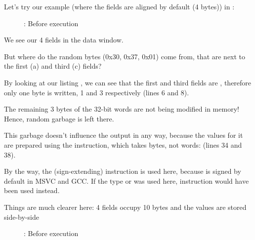 ﻿\clearpage
{}
\myindex{\olly}

Let's try our example (where the fields are aligned by default (4 bytes)) in \olly:

\begin{figure}[H]
\centering
{}
\caption{\olly: Before \printf execution}
\label{fig:packing_olly_4}
\end{figure}

We see our 4 fields in the data window.

But where do the random bytes (0x30, 0x37, 0x01) come from, that are next to the first (a) and third (c) fields?

By looking at our listing , we can see that the first and third fields
are \Tchar, therefore only one byte is written, 1 and 3 respectively (lines 6 and 8).

The remaining 3 bytes of the 32-bit words are not being modified in memory!
Hence, random garbage is left there.

This garbage doesn't influence the \printf output in any way, because the values for it are prepared
using the \MOVSX instruction, which takes bytes, not words: 
 (lines 34 and 38).

By the way, the \MOVSX (sign-extending) instruction is used here, because 
\Tchar is signed by default in MSVC and GCC.
If the type  or  was used here, 
\MOVZX instruction would have been used instead.

\clearpage
{}
\myindex{\olly}

Things are much clearer here: 4 fields occupy 10 bytes and the values are stored side-by-side

\begin{figure}[H]
\centering
{}
\caption{\olly: Before \printf execution}
\label{fig:packing_olly_1}
\end{figure}
